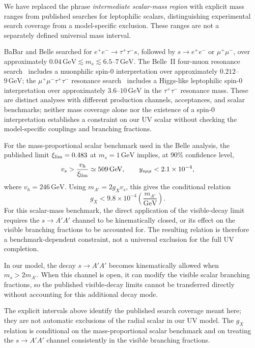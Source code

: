 \documentclass[12pt,a4paper]{article}
\begin{document}
We have replaced the phrase \emph{intermediate scalar-mass region} with explicit mass ranges from published searches for leptophilic scalars, distinguishing experimental search coverage from a model-specific exclusion. These ranges are not a separately defined universal mass interval.

BaBar and Belle searched for
\(e^+e^-\to\tau^+\tau^-s\), followed by
\(s\to e^+e^-\) or \(\mu^+\mu^-\), over approximately
\(0.04\,\mathrm{GeV}\lesssim m_s\lesssim6.5\)--\(7\,\mathrm{GeV}\).
The Belle~II four-muon resonance search~\cite{Belle-II:2024wtd} includes a muonphilic spin-0 interpretation over approximately \(0.212\)--\(9\,\mathrm{GeV}\); the \(\mu^+\mu^-\tau^+\tau^-\) resonance search~\cite{Belle-II:2023ydz} includes a Higgs-like leptophilic spin-0 interpretation over approximately \(3.6\)--\(10\,\mathrm{GeV}\) in the \(\tau^+\tau^-\) resonance mass. These are distinct analyses with different production channels, acceptances, and scalar benchmarks; neither mass coverage alone nor the existence of a spin-0 interpretation establishes a constraint on our UV scalar without checking the model-specific couplings and branching fractions.

For the mass-proportional scalar benchmark used in the Belle analysis, the published limit \(\xi_{\rm lim}=0.483\) at \(m_s=1\,\mathrm{GeV}\) implies, at 90\% confidence level,
\[
v_s>\frac{v_h}{\xi_{\rm lim}}
\simeq509\,\mathrm{GeV},
\qquad
y_{s\mu\mu}<2.1\times10^{-4},
\]
where \(v_h=246\,\mathrm{GeV}\). Using \(m_{A'}=2g_Xv_s\), this gives the conditional relation
\[
g_X<9.8\times10^{-4}
\left(\frac{m_{A'}}{\mathrm{GeV}}\right).
\]
For this scalar-mass benchmark, the direct application of the visible-decay limit requires the \(s\to A'A'\) channel to be kinematically closed, or its effect on the visible branching fractions to be accounted for. The resulting relation is therefore a benchmark-dependent constraint, not a universal exclusion for the full UV completion.

In our model, the decay \(s\to A'A'\) becomes kinematically allowed when \(m_s>2m_{A'}\). When this channel is open, it can modify the visible scalar branching fractions, so the published visible-decay limits cannot be transferred directly without accounting for this additional decay mode.

The explicit intervals above identify the published search coverage meant here; they are not automatic exclusions of the radial scalar in our UV model. The \(g_X\) relation is conditional on the mass-proportional scalar benchmark and on treating the \(s\to A'A'\) channel consistently in the visible branching fractions.
\end{document}
